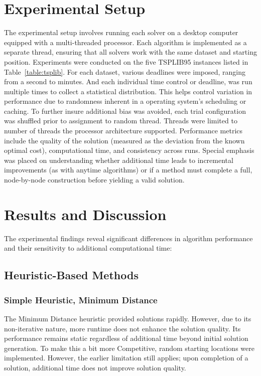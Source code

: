 \documentclass[11pt]{article}
\begin{document}
	\section{Experimental Setup}
	The experimental setup involves running each solver on a desktop computer equipped with a multi-threaded processor. Each algorithm is implemented as a separate thread, ensuring that all solvers work with the same dataset and starting position. Experiments were conducted on the five TSPLIB95 instances listed in Table~\ref{table:tsplib}. For each dataset, various deadlines were imposed, ranging from a second to minutes. And each individual time control or deadline, was run multiple times to collect a statistical distribution. This helps control variation in performance due to randomness inherent in a operating system's scheduling or caching. To further insure additional bias was avoided, each trial configuration was shuffled prior to assignment to random thread. Threads were limited to number of threads the processor architecture supported.
	Performance metrics include the quality of the solution (measured as the deviation from the known optimal cost), computational time, and consistency across runs. Special emphasis was placed on understanding whether additional time leads to incremental improvements (as with anytime algorithms) or if a method must complete a full, node-by-node construction before yielding a valid solution.
	
	\section{Results and Discussion}
	The experimental findings reveal significant differences in algorithm performance and their sensitivity to additional computational time:
	
	\subsection{Heuristic-Based Methods}
	
	
	\subsubsection{Simple Heuristic, Minimum Distance}
	The Minimum Distance heuristic provided solutions rapidly. However, due to its non-iterative nature, more runtime does not enhance the solution quality. Its performance remains static regardless of additional time beyond initial solution generation. To make this a bit more Competitive, random starting locations were implemented. However, the earlier limitation still applies; upon completion of a solution, additional time does not improve solution quality.
	
\end{document}
